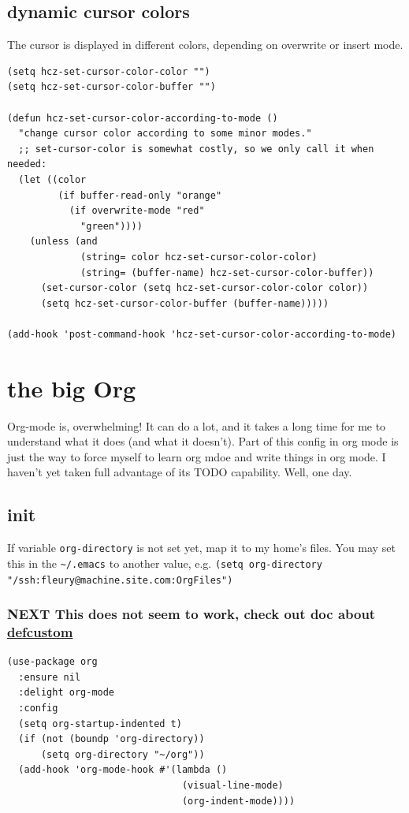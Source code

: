 \documentclass[11pt]{article}
\begin{document}
\subsection{dynamic cursor colors}
\label{sec:org7e05030}

The cursor is displayed in different colors, depending on overwrite or
insert mode.

\begin{verbatim}
(setq hcz-set-cursor-color-color "")
(setq hcz-set-cursor-color-buffer "")

(defun hcz-set-cursor-color-according-to-mode ()
  "change cursor color according to some minor modes."
  ;; set-cursor-color is somewhat costly, so we only call it when needed:
  (let ((color
         (if buffer-read-only "orange"
           (if overwrite-mode "red"
             "green"))))
    (unless (and
             (string= color hcz-set-cursor-color-color)
             (string= (buffer-name) hcz-set-cursor-color-buffer))
      (set-cursor-color (setq hcz-set-cursor-color-color color))
      (setq hcz-set-cursor-color-buffer (buffer-name)))))

(add-hook 'post-command-hook 'hcz-set-cursor-color-according-to-mode)
\end{verbatim}
\section{the big Org}
\label{sec:org2f6f7f4}

Org-mode is, overwhelming! It can do a lot, and it takes a long time
for me to understand what it does (and what it doesn't). Part of this
config in org mode is just the way to force myself to learn org mdoe
and write things in org mode. I haven't yet taken full advantage of
its TODO capability. Well, one day.

\subsection{init}
\label{sec:org0a95cb4}

If variable \texttt{org-directory} is not set yet, map it to my home's
files. You may set this in the \texttt{\textasciitilde{}/.emacs} to another value,
e.g. \texttt{(setq org-directory "/ssh:fleury@machine.site.com:OrgFiles")}

\subsubsection{{\bfseries\sffamily NEXT} This does not seem to work, check out doc about \href{https://stackoverflow.com/questions/3806423/how-can-i-get-a-variables-initial-value-in-elisp}{defcustom}}
\label{sec:orga277f21}
\begin{verbatim}
(use-package org
  :ensure nil
  :delight org-mode
  :config
  (setq org-startup-indented t)
  (if (not (boundp 'org-directory))
      (setq org-directory "~/org"))
  (add-hook 'org-mode-hook #'(lambda ()
                               (visual-line-mode)
                               (org-indent-mode))))
\end{verbatim}
\end{document}
